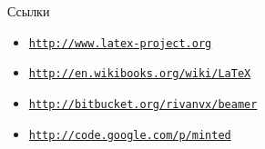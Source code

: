 \begin{frame}[fragile]{Ссылки}
  \begin{itemize}
    \item \texttt{\href{http://www.latex-project.org}{http://www.latex-project.org}}
    \item \texttt{\href{http://en.wikibooks.org/wiki/LaTeX}{http://en.wikibooks.org/wiki/LaTeX}}
    \item \texttt{\href{http://bitbucket.org/rivanvx/beamer}{http://bitbucket.org/rivanvx/beamer}}
    \item \texttt{\href{http://code.google.com/p/minted}{http://code.google.com/p/minted}}
  \end{itemize}
\end{frame}


